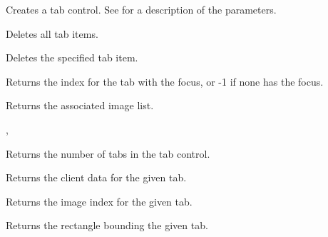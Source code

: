 Creates a tab control. See  for a description
of the parameters.

\label{wxtabctrldeleteallitems}


Deletes all tab items.

\label{wxtabctrldeleteitem}


Deletes the specified tab item.

\label{wxtabctrlgetcurfocus}


Returns the index for the tab with the focus, or -1 if none has the focus.

\label{wxtabctrlgetimagelist}


Returns the associated image list.


, 

\label{wxtabctrlgetitemcount}


Returns the number of tabs in the tab control.

\label{wxtabctrlgetitemdata}


Returns the client data for the given tab.

\label{wxtabctrlgetitemimage}


Returns the image index for the given tab.

\label{wxtabctrlgetitemrect}


Returns the rectangle bounding the given tab.


